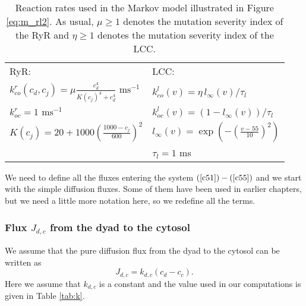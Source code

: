 \begin{table}
\begin{center}
\begin{tabular}[c]{|l|l|} \hline
RyR: & LCC: \\
$k_{co}^{r}(c_d,c_j)=\mu \frac{c_d^4}{K(c_j)^4+c_d^4} \text{ ms}^{-1}$ &$k_{co}^{l}(v)=\eta\, l_{\infty}(v)/\tau_l$ \\
$k_{oc}^{r}=1 \text{ ms}^{-1}$ & $k_{oc}^{l}(v)=(1-l_{\infty}(v))/\tau_l$ \\
$K(c_j) = 20+1000(\frac{1000-c_j}{600})^2$ &  $ l_{\infty}(v) = \exp(-(\frac{v-55}{10})^2)$ \\
 & $\tau_l=1$ ms\\ \hline
\end{tabular}
\end{center}
\caption{Reaction rates used in the Markov model illustrated in 
Figure \ref{eq:m_rl2}.
As usual,  $\mu \ge 1$ denotes the mutation severity
index of the RyR and $\eta \ge 1$ denotes the mutation severity
index of the LCC. }
\label{functions2}
\end{table}

We need to define all the fluxes entering the system $\left( \ref{c51})-(\ref{c55}\right)$ and we start with the simple diffusion fluxes. Some of
them have been used in earlier chapters, but we need a little more notation
here, so we redefine all the terms. 

\subsubsection{Flux $J_{d,c}$ from the dyad to the cytosol}
We assume that the pure diffusion flux
from the dyad to the cytosol can be written as%
\begin{equation}
J_{d,c}=k_{d,c}\left(  c_{d}-c_{c}\right).
 \label{J_dc}
\end{equation}
Here we assume that $k_{d,c}$ is a constant and the value used in our computations is given in Table \ref{tab:k}.

